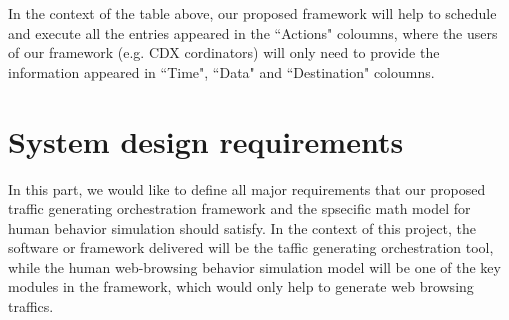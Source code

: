\documentclass[12pt]{report}
\begin{document}
In the context of the table above, our proposed framework will help to schedule and execute all the entries appeared in the ``Actions" coloumns, where the users of our framework (e.g. CDX cordinators) will only need to provide the information appeared in ``Time", ``Data" and ``Destination" coloumns.

\section{System design requirements}

In this part, we would like to define all major requirements that our proposed traffic generating orchestration framework and the spsecific math model for human behavior simulation should satisfy. In the context of this project, the software or framework delivered will be the taffic generating orchestration tool, while the human web-browsing behavior simulation model will be one of the key modules in the framework, which would only help to generate web browsing traffics.
\end{document}
